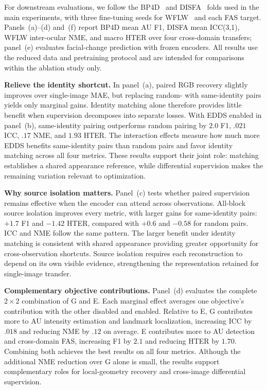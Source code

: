 \documentclass[10pt,journal,compsoc]{IEEEtran}
\begin{document}
For downstream evaluations, we follow the BP4D~\cite{zhang2014bp4d} and DISFA~\cite{mavadati2013disfa} folds used in the main experiments, with three fine-tuning seeds for WFLW~\cite{wu2018look} and each FAS target. Panels~(a)--(d) and~(f) report BP4D mean AU F1, DISFA mean ICC(3,1), WFLW inter-ocular NME, and macro HTER over four cross-domain transfers; panel~(e) evaluates facial-change prediction with frozen encoders. All results use the reduced data and pretraining protocol and are intended for comparisons within the ablation study only.

\noindent\textbf{Relieve the identity shortcut.}
In panel~(a), paired RGB recovery slightly improves over single-image MAE, but replacing random- with same-identity pairs yields only marginal gains. Identity matching alone therefore provides little benefit when supervision decomposes into separate losses. With EDDS enabled in panel~(b), same-identity pairing outperforms random pairing by $2.0$ F1, $.021$ ICC, $.17$ NME, and $1.93$ HTER. The interaction effects measure how much more EDDS benefits same-identity pairs than random pairs and favor identity matching across all four metrics. These results support their joint role: matching establishes a shared appearance reference, while differential supervision makes the remaining variation relevant to optimization.

\noindent\textbf{Why source isolation matters.}
Panel~(c) tests whether paired supervision remains effective when the encoder can attend across observations. All-block source isolation improves every metric, with larger gains for same-identity pairs: $+1.7$ F1 and $-1.42$ HTER, compared with $+0.6$ and $-0.58$ for random pairs. ICC and NME follow the same pattern. The larger benefit under identity matching is consistent with shared appearance providing greater opportunity for cross-observation shortcuts. Source isolation requires each reconstruction to depend on its own visible evidence, strengthening the representation retained for single-image transfer.

\noindent\textbf{Complementary objective contributions.}
Panel~(d) evaluates the complete $2\!\times\!2$ combination of G and E. Each marginal effect averages one objective's contribution with the other disabled and enabled. Relative to E, G contributes more to AU intensity estimation and landmark localization, increasing ICC by $.018$ and reducing NME by $.12$ on average. E contributes more to AU detection and cross-domain FAS, increasing F1 by $2.1$ and reducing HTER by $1.70$. Combining both achieves the best results on all four metrics. Although the additional NME reduction over G alone is small, the results support complementary roles for local-geometry recovery and cross-image differential supervision.
\end{document}
